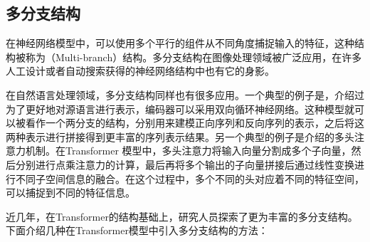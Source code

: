 \subsection{多分支结构}

\parinterval 在神经网络模型中，可以使用多个平行的组件从不同角度捕捉输入的特征，这种结构被称为{\small{}}（Multi-branch）结构。多分支结构在图像处理领域被广泛应用，在许多人工设计或者自动搜索获得的神经网络结构中也有它的身影。

\parinterval 在自然语言处理领域，多分支结构同样也有很多应用。一个典型的例子是，{\chapterten}介绍过为了更好地对源语言进行表示，编码器可以采用双向循环神经网络。这种模型就可以被看作一个两分支的结构，分别用来建模正向序列和反向序列的表示，之后将这两种表示进行拼接得到更丰富的序列表示结果。另一个典型的例子是{\chaptertwelve}介绍的多头注意力机制。在Transformer 模型中，多头注意力将输入向量分割成多个子向量，然后分别进行点乘注意力的计算，最后再将多个输出的子向量拼接后通过线性变换进行不同子空间信息的融合。在这个过程中，多个不同的头对应着不同的特征空间，可以捕捉到不同的特征信息。

\parinterval 近几年，在Transformer的结构基础上，研究人员探索了更为丰富的多分支结构。下面介绍几种在Transformer模型中引入多分支结构的方法：

